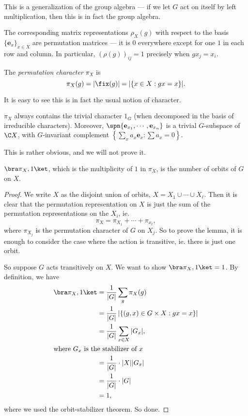 \documentclass[a4paper]{article}
\begin{document}
This is a generalization of the group algebra --- if we let $G$ act on itself by left multiplication, then this is in fact the group algebra.

The corresponding matrix representations $\rho_X(g)$ with respect to the basis $\{\mathbf{e}_x\}_{x \in X}$ are permutation matrices --- it is $0$ everywhere except for one $1$ in each row and column. In particular, $(\rho(g))_{ij} = 1$ precisely when $g x_j = x_i$.

\begin{defi}
  The \emph{permutation character} $\pi_X$ is
  \[
    \pi_X(g) = |\fix(g)| = |\{x \in X: gx = x\}|.
  \]
\end{defi}
It is easy to see this is in fact the usual notion of character.

\begin{lemma}
  $\pi_X$ always contains the trivial character $1_G$ (when decomposed in the basis of irreducible characters). Moreover, $\spn\{\mathbf{e}_{x_1}, \cdots, \mathbf{e}_{x_n}\}$ is a trivial $G$-subspace of $\C X$, with $G$-invariant complement $\left\{\sum_x a_x \mathbf{e}_x: \sum a_x = 0\right\}$.
\end{lemma}
This is rather obvious, and we will not prove it.

\begin{lemma}
  $\bra \pi_X, 1\ket$, which is the multiplicity of $1$ in $\pi_X$, is the number of orbits of $G$ on $X$.
\end{lemma}

\begin{proof}
  We write $X$ as the disjoint union of orbits, $X = X_1 \cup \cdots \cup X_\ell$. Then it is clear that the permutation representation on $X$ is just the sum of the permutation representations on the $X_i$, ie.
  \[
    \pi_X = \pi_{X_1} + \cdots + \pi_{x_\ell},
  \]
  where $\pi_{X_j}$ is the permutation character of $G$ on $X_j$. So to prove the lemma, it is enough to consider the case where the action is transitive, ie. there is just one orbit.

  So suppose $G$ acts transitively on $X$. We want to show $\bra \pi_X, 1\ket = 1$. By definition, we have
  \begin{align*}
    \bra \pi_X, 1 \ket &= \frac{1}{|G|} \sum_g \pi_X(g) \\
    &= \frac{1}{|G|} \left|\{(g, x) \in G\times X: gx = x\}\right|\\
    &= \frac{1}{|G|} \sum_{x \in X} |G_x|,\\
    \intertext{where $G_x$ is the stabilizer of $x$}
    &= \frac{1}{|G|} \cdot |X| |G_x| \\
    &= \frac{1}{|G|} \cdot |G|\\
    &= 1,
  \end{align*}
  where we used the orbit-stabilizer theorem. So done.
\end{proof}
\end{document}
